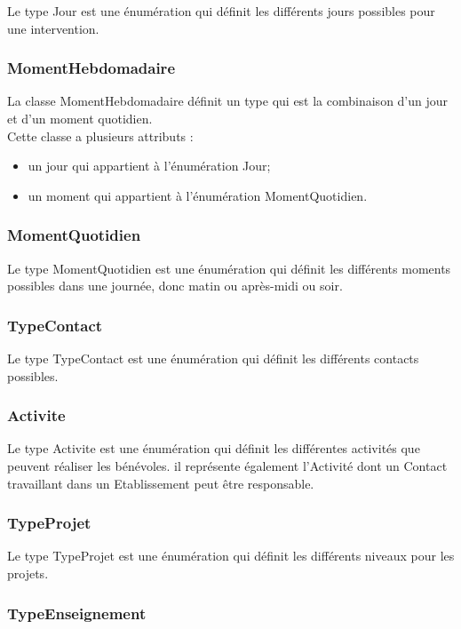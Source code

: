 Le type Jour est une énumération qui définit les différents jours possibles pour une intervention.

\subsubsection*{MomentHebdomadaire}

La classe MomentHebdomadaire définit un type qui est la combinaison d'un jour et d'un moment quotidien.\\
Cette classe a plusieurs attributs :
\begin{itemize}
\item un jour qui appartient à l'énumération Jour;
\item un moment qui appartient à l'énumération MomentQuotidien.
\end{itemize}

\subsubsection*{MomentQuotidien}

Le type MomentQuotidien est une énumération qui définit les différents moments possibles dans une journée, donc matin ou après-midi ou soir.

\subsubsection*{TypeContact}

Le type TypeContact est une énumération qui définit les différents contacts possibles.

\subsubsection*{Activite}

Le type Activite est une énumération qui définit les différentes activités que peuvent réaliser les bénévoles. il représente également l'Activité dont un Contact travaillant dans un Etablissement peut être responsable.

\subsubsection*{TypeProjet}

Le type TypeProjet est une énumération qui définit les différents niveaux pour les projets.

\subsubsection*{TypeEnseignement}

